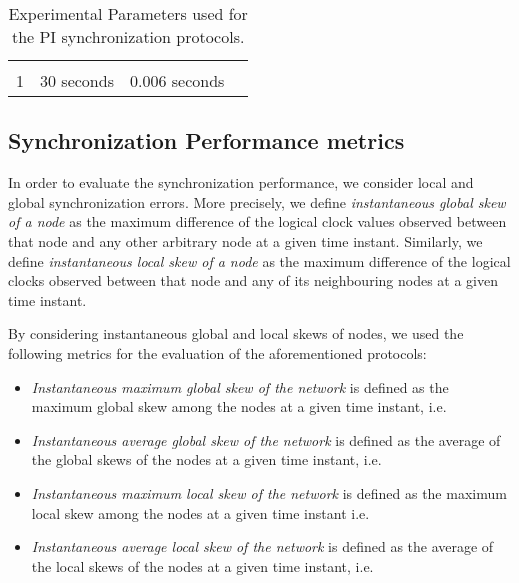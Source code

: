 \documentclass[english,a4paper,10pt,final]{article}
\numberwithin{equation}{section}
\numberwithin{figure}{section}
\begin{document}
\begin{table}

\center
\caption{Experimental Parameters used for the PI synchronization protocols.\label{tab:PI-Experimental-Parameters}}

\begin{tabular}{cccc}
 &  &  &   \\ 
1 & 30 seconds & 0.006 seconds &  
\end{tabular}


\end{table}

\subsection{Synchronization Performance metrics}

In order to evaluate the synchronization performance, we consider local and global synchronization errors. More precisely, we define \textit{instantaneous global skew of a node} as the maximum difference of the logical clock values observed between that node and any other arbitrary node at a given time instant. Similarly, we define \textit{instantaneous local skew of a node} as the maximum difference of the logical clocks observed between that node and any of its neighbouring nodes at a given time instant. 

By considering instantaneous global and local skews of nodes, we used the following metrics for the evaluation of the aforementioned protocols: 
\begin{itemize}

\item \textit{Instantaneous maximum global skew of the network} is defined as the maximum global skew among the nodes at a given time instant, i.e.  

\item \textit{Instantaneous average global skew of the network} is defined as the average of the global skews of the nodes at a given time instant, i.e. 

\item 
\textit{Instantaneous maximum local skew of the network} is defined as the maximum local skew among the nodes at a given time instant i.e. 



\item 
\textit{Instantaneous average local skew of the network} is defined as the average of the local skews of the nodes at a given time instant, i.e. 

\end{itemize}
\end{document}
